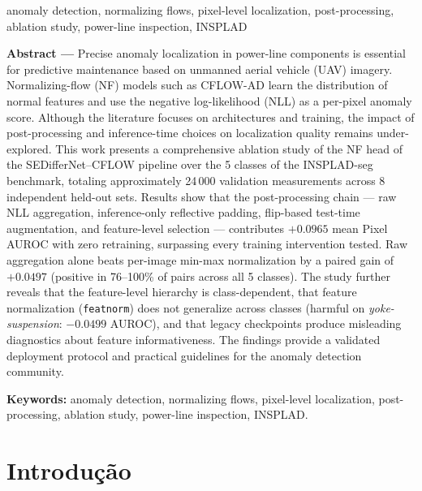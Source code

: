 \documentclass[conference]{IEEEtran}
\begin{document}
\begin{IEEEkeywords}
anomaly detection, normalizing flows, pixel-level localization, post-processing, ablation study, power-line inspection, INSPLAD
\end{IEEEkeywords}

\vspace{0.5em}
\noindent\textbf{Abstract ---}
Precise anomaly localization in power-line components is essential for predictive maintenance based on unmanned aerial vehicle (UAV) imagery. Normalizing-flow (NF) models such as CFLOW-AD learn the distribution of normal features and use the negative log-likelihood (NLL) as a per-pixel anomaly score. Although the literature focuses on architectures and training, the impact of post-processing and inference-time choices on localization quality remains under-explored. This work presents a comprehensive ablation study of the NF head of the SEDifferNet--CFLOW pipeline over the 5 classes of the INSPLAD-seg benchmark, totaling approximately 24\,000 validation measurements across 8 independent held-out sets. Results show that the post-processing chain --- raw NLL aggregation, inference-only reflective padding, flip-based test-time augmentation, and feature-level selection --- contributes $+0.0965$ mean Pixel AUROC with zero retraining, surpassing every training intervention tested. Raw aggregation alone beats per-image min-max normalization by a paired gain of $+0.0497$ (positive in 76--100\% of pairs across all 5 classes). The study further reveals that the feature-level hierarchy is class-dependent, that feature normalization (\texttt{featnorm}) does not generalize across classes (harmful on \textit{yoke-suspension}: $-0.0499$ AUROC), and that legacy checkpoints produce misleading diagnostics about feature informativeness. The findings provide a validated deployment protocol and practical guidelines for the anomaly detection community.

\vspace{0.5em}
\noindent\textbf{Keywords:} anomaly detection, normalizing flows, pixel-level localization, post-processing, ablation study, power-line inspection, INSPLAD.

\section{Introdução}
\end{document}
